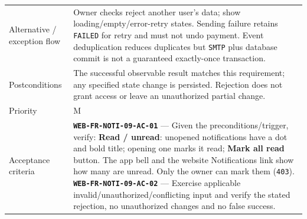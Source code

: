 \begin{longtable}{@{}P{0.23000\SRSWidth}P{0.77000\SRSWidth}@{}}
Alternative /\allowbreak{} exception flow & Owner checks reject another user’s data; show loading/\allowbreak{}empty/\allowbreak{}error-retry states. Sending failure retains \texttt{FAILED} for retry and must not undo payment. Event deduplication reduces duplicates but \texttt{SMTP} plus database commit is not a guaranteed exactly-once transaction. \\[3pt]
Postconditions & The successful observable result matches this requirement; any specified state change is persisted. Rejection does not grant access or leave an unauthorized partial change. \\[3pt]
Priority & M \\[3pt]
Acceptance criteria & \textbf{\texttt{WEB-\allowbreak{}FR-\allowbreak{}NOTI-\allowbreak{}09-\allowbreak{}AC-\allowbreak{}01}} — Given the preconditions/\allowbreak{}trigger, verify: \textbf{Read /\allowbreak{} unread}: unopened notifications have a dot and bold title; opening one marks it read; \textbf{Mark all read} button. The app bell and the website Notifications link show how many are unread. Only the owner can mark them (\texttt{403}). \textbf{\texttt{WEB-\allowbreak{}FR-\allowbreak{}NOTI-\allowbreak{}09-\allowbreak{}AC-\allowbreak{}02}} — Exercise applicable invalid/\allowbreak{}unauthorized/\allowbreak{}conflicting input and verify the stated rejection, no unauthorized changes and no false success. \\[3pt]

\end{longtable}
